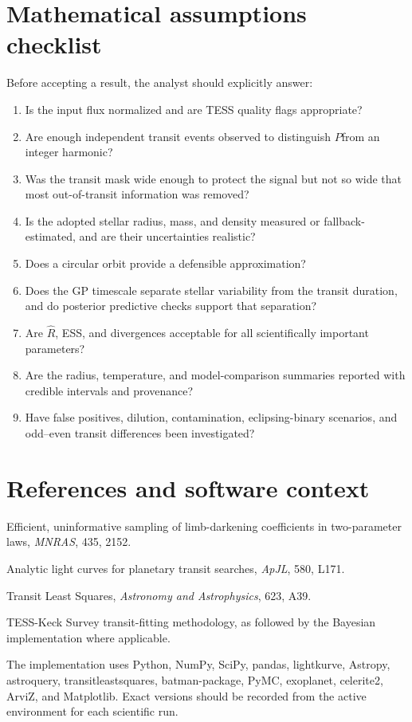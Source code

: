 \documentclass[12pt,a4paper,oneside]{report}
\newcommand{\Porb}{\ensuremath{P}}
\begin{document}
\chapter{Mathematical assumptions checklist}
Before accepting a result, the analyst should explicitly answer:
\begin{enumerate}
  \item Is the input flux normalized and are TESS quality flags appropriate?
  \item Are enough independent transit events observed to distinguish \Porb from
        an integer harmonic?
  \item Was the transit mask wide enough to protect the signal but not so wide
        that most out-of-transit information was removed?
  \item Is the adopted stellar radius, mass, and density measured or fallback-
        estimated, and are their uncertainties realistic?
  \item Does a circular orbit provide a defensible approximation?
  \item Does the GP timescale separate stellar variability from the transit
        duration, and do posterior predictive checks support that separation?
  \item Are \(\hat R\), ESS, and divergences acceptable for all scientifically
        important parameters?
  \item Are the radius, temperature, and model-comparison summaries reported
        with credible intervals and provenance?
  \item Have false positives, dilution, contamination, eclipsing-binary
        scenarios, and odd--even transit differences been investigated?
\end{enumerate}

\chapter*{References and software context}
\begin{description}[leftmargin=3.5cm,style=nextline]
  \item[Kipping (2013)] Efficient, uninformative sampling of limb-darkening
  coefficients in two-parameter laws, \emph{MNRAS}, 435, 2152.
  \item[Mandel and Agol (2002)] Analytic light curves for planetary transit
  searches, \emph{ApJL}, 580, L171.
  \item[Hippke et al. (2019)] Transit Least Squares, \emph{Astronomy and
  Astrophysics}, 623, A39.
  \item[Polanski et al. (2023)] TESS-Keck Survey transit-fitting methodology,
  as followed by the Bayesian implementation where applicable.
  \item[Software] The implementation uses Python, NumPy, SciPy, pandas,
  lightkurve, Astropy, astroquery, transitleastsquares, batman-package,
  PyMC, exoplanet, celerite2, ArviZ, and Matplotlib. Exact versions should be
  recorded from the active environment for each scientific run.
\end{description}
\end{document}
